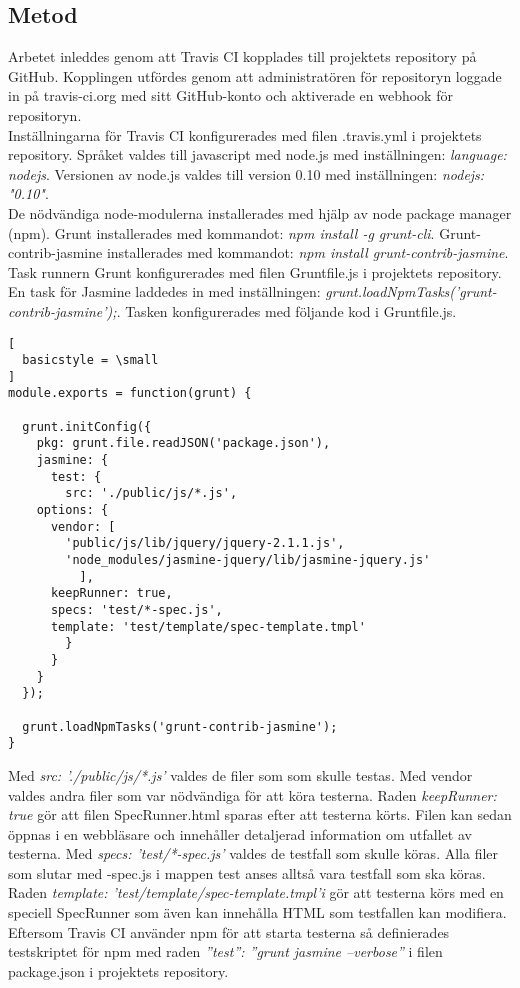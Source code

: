 \subsection{Metod}
Arbetet inleddes genom att Travis CI kopplades till projektets repository på GitHub.
Kopplingen utfördes
genom att administratören för repositoryn loggade in på travis-ci.org med 
sitt GitHub-konto och aktiverade
en webhook för repositoryn.\\

Inställningarna för Travis CI konfigurerades med filen .travis.yml i projektets
repository. Språket valdes till
javascript med node.js med inställningen: \emph{language: node\textunderscore js}.
Versionen av node.js valdes till version 0.10
med inställningen: \emph{node\textunderscore js: "0.10"}.\\

De nödvändiga node-modulerna installerades med hjälp av node package manager (npm).
Grunt installerades
med kommandot: \emph{npm install -g grunt-cli}. Grunt-contrib-jasmine installerades med kommandot: 
\emph{npm install grunt-contrib-jasmine}.\\

Task runnern Grunt konfigurerades med filen Gruntfile.js i projektets repository.
En task för Jasmine laddedes in med
inställningen: \emph{grunt.loadNpmTasks('grunt-contrib-jasmine');}.
Tasken konfigurerades med följande kod i Gruntfile.js.

\begin{lstlisting}[
  basicstyle = \small
]
module.exports = function(grunt) {

  grunt.initConfig({
    pkg: grunt.file.readJSON('package.json'),
    jasmine: {
      test: {
        src: './public/js/*.js',
	options: {
	  vendor: [
	    'public/js/lib/jquery/jquery-2.1.1.js',
	    'node_modules/jasmine-jquery/lib/jasmine-jquery.js'
          ],
	  keepRunner: true,
	  specs: 'test/*-spec.js',
	  template: 'test/template/spec-template.tmpl'
        }
      }
    }
  });

  grunt.loadNpmTasks('grunt-contrib-jasmine');
}
\end{lstlisting}

Med \emph{src: './public/js/*.js'} valdes de filer som som skulle testas.
Med vendor valdes andra filer som var nödvändiga för att köra testerna.
Raden \emph{keepRunner: true} gör att filen \textunderscore SpecRunner.html sparas efter att
testerna körts. Filen kan sedan öppnas i en webbläsare och innehåller
detaljerad information om utfallet av testerna.
Med \emph{specs: 'test/*-spec.js'} valdes de testfall som skulle köras.
Alla filer som slutar med -spec.js i mappen test anses alltså vara
testfall som ska köras.
Raden \emph{template: 'test/template/spec-template.tmpl'i} gör att testerna
körs med en speciell SpecRunner som även kan innehålla HTML som testfallen
kan modifiera.
Eftersom Travis CI använder npm för att starta 
testerna så definierades testskriptet för npm med raden
\emph{''test'': ''grunt jasmine --verbose''} i filen package.json 
i projektets repository.\\

